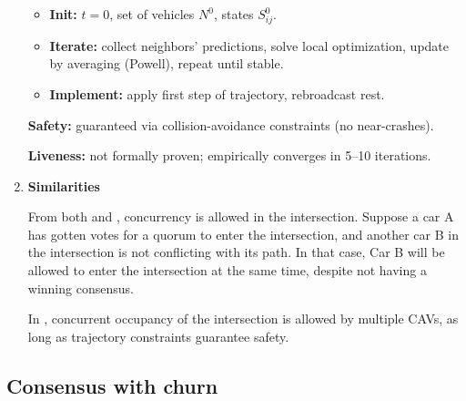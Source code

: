 \documentclass[fleqn,10pt]{olplainarticle}
\begin{document}
\begin{enumerate}
\begin{itemize}
    \item \textbf{Init:} $t=0$, set of vehicles $N^0$, states $S_{ij}^0$.
    \item \textbf{Iterate:} collect neighbors’ predictions, solve local optimization, update by averaging (Powell), repeat until stable.
    \item \textbf{Implement:} apply first step of trajectory, rebroadcast rest.
\end{itemize}

\textbf{Safety:} guaranteed via collision-avoidance constraints (no near-crashes).  

\textbf{Liveness:} not formally proven; empirically converges in 5--10 iterations.



\item 
\textbf{Similarities}

From both \cite{inproceedings} and \cite{lee2025distributedconsensusalgorithmprioritizing}, concurrency is allowed in the intersection. Suppose a car A has gotten votes for a quorum to enter the intersection, and another car B in the intersection is not conflicting with its path. In that case, Car B will be allowed to enter the intersection at the same time, despite not having a winning consensus. 

In \cite{MIRHELI2019161}, concurrent occupancy of the intersection is allowed by multiple CAVs, as long as trajectory constraints guarantee safety.


\end{enumerate}

\subsection{Consensus with churn}





\end{document}
